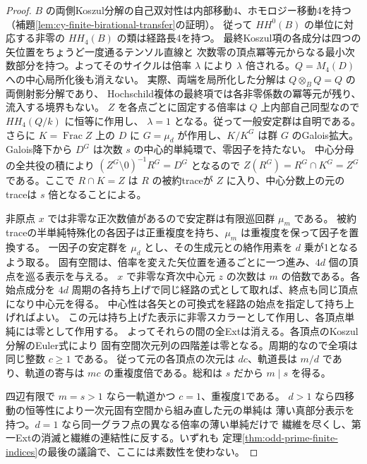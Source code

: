 \begin{proof}
$B$ の両側Koszul分解の自己双対性は内部移動4、ホモロジー移動4を持つ
（補題\ref{lem:cy-finite-birational-transfer}の証明）。
従って $HH^0(B)$ の単位に対応する非零の $HH_4(B)$ の類は経路長4を持つ。
最終Koszul項の各成分は四つの矢位置をちょうど一度通るテンソル直線と
次数零の頂点冪等元からなる最小次数部分を持つ。よってそのサイクルは倍率
$\lambda$ により $\lambda$ 倍される。$Q=M_4(D)$ への中心局所化後も消えない。
実際、両端を局所化した分解は $Q\otimes_B Q=Q$ の両側射影分解であり、
Hochschild複体の最終項では各非零係数の冪等元が残り、流入する境界もない。
$Z$ を各点ごとに固定する倍率は $Q$ 上内部自己同型なので $HH_4(Q/k)$ に恒等に作用し、
$\lambda=1$ となる。従って一般安定群は自明である。さらに
$K=\operatorname{Frac}Z$ 上の $D$ に $G=\mu_d$ が作用し、$K/K^G$ は群 $G$ のGalois拡大。
Galois降下から $D^G$ は次数 $s$ の中心的単純環で、零因子を持たない。
中心分母の全共役の積により $(Z^G\setminus0)^{-1}R^G=D^G$ となるので
$Z(R^G)=R^G\cap K^G=Z^G$ である。ここで $R\cap K=Z$ は
$R$ の被約traceが $Z$ に入り、中心分数上の元のtraceは $s$ 倍となることによる。

非原点 $x$ では非零な正次数値があるので安定群は有限巡回群 $\mu_m$ である。
被約traceの半単純特殊化の各因子は正重複度を持ち、$\mu_m$ は重複度を保って因子を置換する。
一因子の安定群を $\mu_d$ とし、その生成元との絡作用素を $d$ 乗が1となるよう取る。
固有空間は、倍率を変えた矢位置を通るごとに一つ進み、$4d$ 個の頂点を巡る表示を与える。
$x$ で非零な斉次中心元 $z$ の次数は $m$ の倍数である。各始点成分を
$4d$ 周期の各持ち上げで同じ経路の式として取れば、終点も同じ頂点になり中心元を得る。
中心性は各矢との可換式を経路の始点を指定して持ち上げればよい。
この元は持ち上げた表示に非零スカラーとして作用し、各頂点単純には零として作用する。
よってそれらの間の全Extは消える。各頂点のKoszul分解のEuler式により
固有空間次元列の四階差は零となる。周期的なので全項は同じ整数 $c\ge1$ である。
従って元の各頂点の次元は $dc$、軌道長は $m/d$ であり、軌道の寄与は
$m c$ の重複度倍である。総和は $s$ だから $m\mid s$ を得る。

四辺有限で $m=s>1$ なら一軌道かつ $c=1$、重複度1である。
$d>1$ なら四移動の恒等性により一次元固有空間から組み直した元の単純は
薄い真部分表示を持つ。$d=1$ なら同一グラフ点の異なる倍率の薄い単純だけで
繊維を尽くし、第一Extの消滅と繊維の連結性に反する。いずれも
定理\ref{thm:odd-prime-finite-indices}の最後の議論で、ここには素数性を使わない。
\end{proof}

